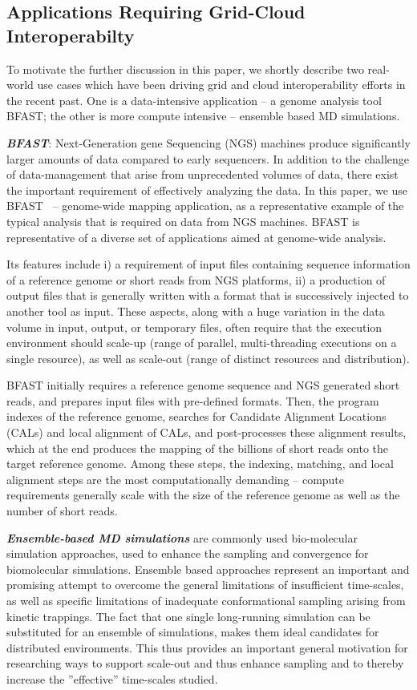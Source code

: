 \documentclass[10pt,conference,final,letterpaper,twoside,twocolumn,]{IEEEtran}
\newcommand{\I}[1]{\textit{#1}}
\newcommand{\B}[1]{\textbf{#1}}
\newcommand{\BI}[1]{\B{\I{#1}}}
\begin{document}
 \subsection*{Applications Requiring Grid-Cloud Interoperabilty}

 To motivate the further discussion in this paper, we shortly describe
 two real-world use cases which have been driving grid and cloud
 interoperability efforts in the recent past.  One is a data-intensive
 application -- a genome analysis tool BFAST; the other is more
 compute intensive -- ensemble based MD simulations.
 
 \BI{BFAST}: Next-Generation gene Sequencing (NGS) machines produce
 significantly larger amounts of data compared to early sequencers.
 In addition to the challenge of data-management that arise from
 unprecedented volumes of data, there exist the important requirement
 of effectively analyzing the data.  In this paper, we use
 BFAST~\cite{bfast2009,bfast2009b} -- genome-wide mapping application,
 as a representative example of the typical analysis that is required
 on data from NGS machines.  BFAST is representative of a diverse set
 of applications aimed at genome-wide analysis.
 
 Its features include i) a requirement of input files containing
 sequence information of a reference genome or short reads from NGS
 platforms, ii) a production of output files that is generally written
 with a format that is successively injected to another tool as input.
 These aspects, along with a huge variation in the data volume in
 input, output, or temporary files, often require that the execution
 environment should scale-up (range of parallel, multi-threading
 executions on a single resource), as well as scale-out (range of
 distinct resources and distribution).
 
 BFAST initially requires a reference genome sequence and NGS
 generated short reads, and prepares input files with pre-defined
 formats.  Then, the program indexes of the reference genome, searches
 for Candidate Alignment Locations (CALs) and local alignment of CALs,
 and post-processes these alignment results, which at the end produces
 the mapping of the billions of short reads onto the target reference
 genome.  Among these steps, the indexing, matching, and local
 alignment steps are the most computationally demanding -- compute
 requirements generally scale with the size of the reference genome as
 well as the number of short reads.

 \BI{Ensemble-based MD simulations} are commonly used bio-molecular
 simulation approaches, used to enhance the sampling and convergence
 for biomolecular simulations.  Ensemble based approaches represent an
 important and promising attempt to overcome the general limitations
 of insufficient time-scales, as well as specific limitations of
 inadequate conformational sampling arising from kinetic trappings.
 The fact that one single long-running simulation can be substituted
 for an ensemble of simulations, makes them ideal candidates for
 distributed environments.  This thus provides an important general
 motivation for researching ways to support scale-out and thus enhance
 sampling and to thereby increase the ''effective'' time-scales
 studied. 
 
\end{document}
